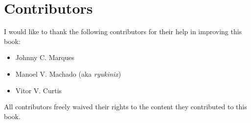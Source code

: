 \newpage

\section*{Contributors}

I would like to thank the following contributors for their help in improving this book:

\begin{itemize}
  \itemsep0em
  \item Johnny C. Marques
  \item Manoel V. Machado (aka \emph{ryukinix})
  \item Vitor V. Curtis
\end{itemize}

All contributors freely waived their rights to the content they contributed to this book.
